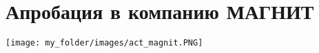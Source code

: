 \chapter{Апробация в компанию МАГНИТ}\label{vkr_magnit}

% 



\texttt{[image: my\_folder/images/act\_magnit.PNG]}
\clearpage

